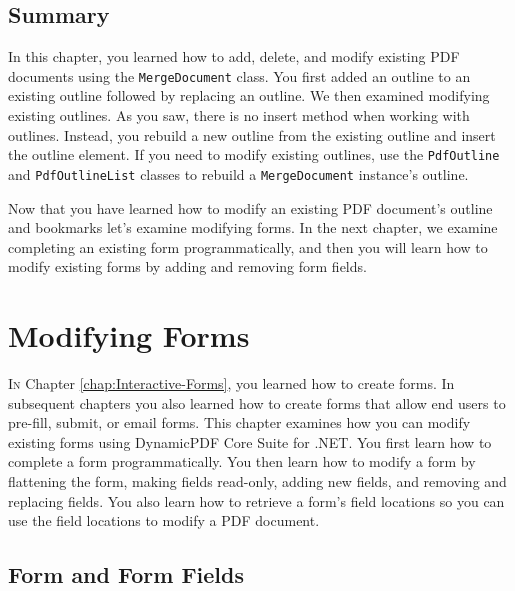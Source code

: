 \documentclass[american,letterpaper]{tufte-book}
\numberwithin{equation}{section}
\numberwithin{figure}{section}
\def\color#1{}%
\begin{document}
{{\section{Summary}

In this chapter, you learned how to add, delete, and modify existing
PDF documents using the \texttt{MergeDocument} class. You first added
an outline to an existing outline followed by replacing an outline.
We then examined modifying existing outlines. As you saw, there is
no insert method when working with outlines. Instead, you rebuild
a new outline from the existing outline and insert the outline element.
If you need to modify existing outlines, use the \texttt{PdfOutline}
and \texttt{PdfOutlineList} classes to rebuild a \texttt{MergeDocument}
instance's outline.

Now that you have learned how to modify an existing PDF document's
outline and bookmarks let's examine modifying forms. In the next chapter,
we examine completing an existing form programmatically, and then
you will learn how to modify existing forms by adding and removing
form fields.
\color{white}
\chapter{Modifying Forms}\label{chap:Modifying-Forms}
\color{black}
\BgThispage
\vspace{8.00em}
\lettrine[lines=2,lhang=0.1]{I}{n} Chapter \ref{chap:Interactive-Forms}, you learned how to create forms. In subsequent chapters you also learned how to create forms that allow end users to pre-fill,
submit, or email forms. This chapter examines how you can modify existing
forms using DynamicPDF Core Suite for .NET. You first learn how
to complete a form programmatically. You then learn how to modify
a form by flattening the form, making fields read-only, adding new
fields, and removing and replacing fields. You also learn how to retrieve
a form's field locations so you can use the field locations to modify
a PDF document. 

\section{Form and Form Fields}

}}
\end{document}
